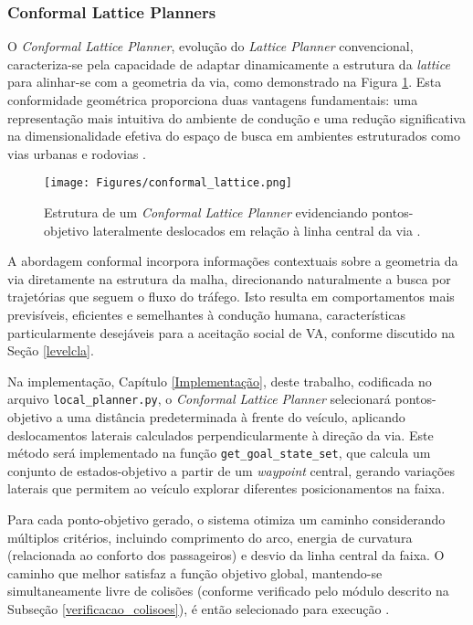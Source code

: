 \subsubsection{Conformal Lattice Planners} \label{conformal_lattice_planners}

O \textit{Conformal Lattice Planner}, evolução do \textit{Lattice Planner} convencional, caracteriza-se pela capacidade de adaptar dinamicamente a estrutura da \textit{lattice} para alinhar-se com a geometria da via, como demonstrado na Figura \ref{conformal_lattice}. Esta conformidade geométrica proporciona duas vantagens fundamentais: uma representação mais intuitiva do ambiente de condução e uma redução significativa na dimensionalidade efetiva do espaço de busca em ambientes estruturados como vias urbanas e rodovias \cite{University_of_Toronto2018-mp}.

\begin{figure}[H]
\centering
\texttt{[image: Figures/conformal\_lattice.png]}
\caption{Estrutura de um \textit{Conformal Lattice Planner} evidenciando pontos-objetivo lateralmente deslocados em relação à linha central da via \cite[Module 2 - Lesson 4: Hierarchical Motion Planning. ~15min30s]{University_of_Toronto2018-mp}.}
\label{conformal_lattice}
\end{figure}

A abordagem conformal incorpora informações contextuais sobre a geometria da via diretamente na estrutura da malha, direcionando naturalmente a busca por trajetórias que seguem o fluxo do tráfego. Isto resulta em comportamentos mais previsíveis, eficientes e semelhantes à condução humana, características particularmente desejáveis para a aceitação social de VA, conforme discutido na Seção \ref{levelcla}.

Na implementação, Capítulo \ref{Implementação}, deste trabalho, codificada no arquivo \texttt{local\_planner.py}, o \textit{Conformal Lattice Planner} selecionará pontos-objetivo a uma distância predeterminada à frente do veículo, aplicando deslocamentos laterais calculados perpendicularmente à direção da via. Este método será implementado na função \texttt{get\_goal\_state\_set}, que calcula um conjunto de estados-objetivo a partir de um \textit{waypoint} central, gerando variações laterais que permitem ao veículo explorar diferentes posicionamentos na faixa.

Para cada ponto-objetivo gerado, o sistema otimiza um caminho considerando múltiplos critérios, incluindo comprimento do arco, energia de curvatura (relacionada ao conforto dos passageiros) e desvio da linha central da faixa. O caminho que melhor satisfaz a função objetivo global, mantendo-se simultaneamente livre de colisões (conforme verificado pelo módulo descrito na Subseção \ref{verificacao_colisoes}), é então selecionado para execução \cite{University_of_Toronto2018-mp}.

